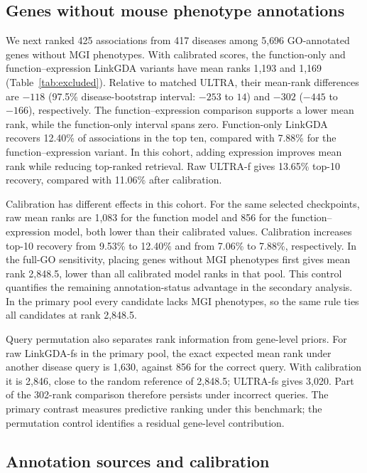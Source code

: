 \documentclass[webpdf,contemporary,large]{oup-authoring-template}%
\theoremstyle{thmstyleone}%
\theoremstyle{thmstyletwo}%
\theoremstyle{thmstylethree}%
\newcommand{\method}{LinkGDA}
\begin{document}
\subsection{Genes without mouse phenotype annotations}

We next ranked 425 associations from 417 diseases among 5{,}696 GO-annotated
genes without MGI phenotypes. With calibrated scores, the function-only and
function--expression \method{} variants have mean ranks 1{,}193 and 1{,}169
(Table~\ref{tab:excluded}). Relative to matched ULTRA, their mean-rank
differences are $-118$ (97.5\% disease-bootstrap interval: $-253$ to $14$)
and $-302$ ($-445$ to $-166$), respectively. The function--expression
comparison supports a lower mean rank, while the function-only interval
spans zero. Function-only \method{} recovers 12.40\% of associations in
the top ten, compared with 7.88\% for the function--expression variant.
In this cohort, adding expression improves mean rank while reducing
top-ranked retrieval. Raw ULTRA-f gives 13.65\% top-10 recovery, compared
with 11.06\% after calibration.



Calibration has different effects in this cohort. For the same selected
checkpoints, raw mean ranks are 1{,}083 for the function model and 856 for
the function--expression model, both lower than their calibrated values.
Calibration increases top-10 recovery from 9.53\% to 12.40\% and from
7.06\% to 7.88\%, respectively. In the full-GO sensitivity, placing genes without MGI phenotypes first gives
mean rank 2{,}848.5, lower than all calibrated model ranks in that pool.
This control quantifies the remaining annotation-status advantage in the
secondary analysis. In the primary pool every candidate lacks MGI phenotypes,
so the same rule ties all candidates at rank 2{,}848.5.

Query permutation also separates rank information from gene-level priors.
For raw \method{}-fs in the primary pool, the exact expected mean rank under
another disease query is 1,630, against 856 for the correct query. With
calibration it is 2,846, close to the random reference of 2,848.5; ULTRA-fs
gives 3,020. Part of the 302-rank comparison therefore persists under incorrect
queries. The primary contrast measures predictive ranking under this benchmark;
the permutation control identifies a residual gene-level contribution.

\subsection{Annotation sources and calibration}
\label{sec:calibration_results}
\end{document}
